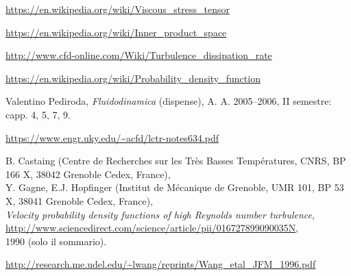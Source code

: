 \documentclass[12pt,a4paper]{article}
\numberwithin{equation}{section}
\begin{document}
\begin{thebibliography}{11}
  \url{https://en.wikipedia.org/wiki/Viscous_stress_tensor}

  \url{https://en.wikipedia.org/wiki/Inner_product_space}
  
  \url{http://www.cfd-online.com/Wiki/Turbulence_dissipation_rate}  
  
  \url{https://en.wikipedia.org/wiki/Probability_density_function}
  
  Valentino Pediroda, 
  \emph{Fluidodinamica} (dispense), A. A. 2005--2006, II semestre: capp. 4, 5, 7, 9.
  
  \url{https://www.engr.uky.edu/~acfd/lctr-notes634.pdf}  
  
  B. Castaing (Centre de Recherches sur les Très Basses Températures, CNRS, BP 166 X, 38042 Grenoble Cedex, France), \\
  Y. Gagne, E.J. Hopfinger (Institut de Mécanique de Grenoble, UMR 101, BP 53 X, 38041 Grenoble Cedex, France), \\
  \emph{Velocity probability density functions of high Reynolds number turbulence}, \\
  \url{http://www.sciencedirect.com/science/article/pii/016727899090035N}, \\
  1990 (solo il sommario).
  
  \url{http://research.me.udel.edu/~lwang/reprints/Wang_etal_JFM_1996.pdf}
  
\end{thebibliography}
\end{document}
